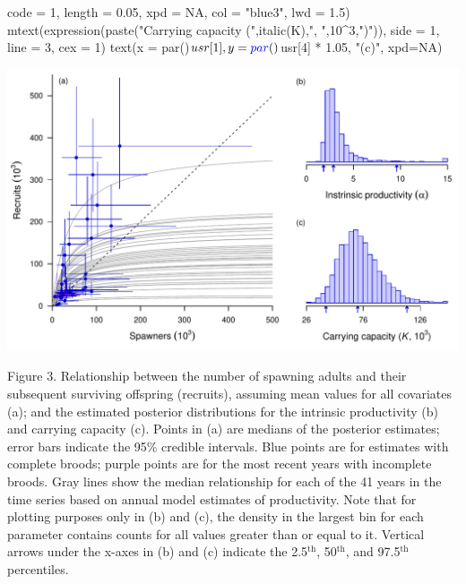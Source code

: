 \documentclass[11pt,]{article}
\newenvironment{Shaded}{}{}
\newcommand{\KeywordTok}[1]{\textcolor[rgb]{0.00,0.00,1.00}{#1}}
\newcommand{\DataTypeTok}[1]{#1}
\newcommand{\DecValTok}[1]{#1}
\newcommand{\FloatTok}[1]{#1}
\newcommand{\StringTok}[1]{\textcolor[rgb]{0.00,0.50,0.50}{#1}}
\newcommand{\OtherTok}[1]{\textcolor[rgb]{1.00,0.25,0.00}{#1}}
\newcommand{\OperatorTok}[1]{#1}
\newcommand{\NormalTok}[1]{#1}
\begin{document}
\begin{Shaded}
\begin{Highlighting}[]
       \DataTypeTok{code =} \DecValTok{1}\NormalTok{, }\DataTypeTok{length =} \FloatTok{0.05}\NormalTok{, }\DataTypeTok{xpd =} \OtherTok{NA}\NormalTok{, }\DataTypeTok{col =} \StringTok{"blue3"}\NormalTok{, }\DataTypeTok{lwd =} \FloatTok{1.5}\NormalTok{)}
\KeywordTok{mtext}\NormalTok{(}\KeywordTok{expression}\NormalTok{(}\KeywordTok{paste}\NormalTok{(}\StringTok{"Carrying capacity ("}\NormalTok{,}\KeywordTok{italic}\NormalTok{(K),}\StringTok{", "}\NormalTok{,}\DecValTok{10}\OperatorTok{^}\DecValTok{3}\NormalTok{,}\StringTok{")"}\NormalTok{)),}
      \DataTypeTok{side =} \DecValTok{1}\NormalTok{, }\DataTypeTok{line =} \DecValTok{3}\NormalTok{, }\DataTypeTok{cex =} \DecValTok{1}\NormalTok{)}
\KeywordTok{text}\NormalTok{(}\DataTypeTok{x =} \KeywordTok{par}\NormalTok{()}\OperatorTok{$}\NormalTok{usr[}\DecValTok{1}\NormalTok{],}
     \DataTypeTok{y =} \KeywordTok{par}\NormalTok{()}\OperatorTok{$}\NormalTok{usr[}\DecValTok{4}\NormalTok{] }\OperatorTok{*}\StringTok{ }\FloatTok{1.05}\NormalTok{,}
     \StringTok{"(c)"}\NormalTok{, }\DataTypeTok{xpd=}\OtherTok{NA}\NormalTok{)}
\end{Highlighting}
\end{Shaded}

\begin{center}\includegraphics{App_3_Summarize_results_files/figure-latex/fig_3_S-R-1} \end{center}

Figure 3. Relationship between the number of spawning adults and their
subsequent surviving offspring (recruits), assuming mean values for all
covariates (a); and the estimated posterior distributions for the
intrinsic productivity (b) and carrying capacity (c). Points in (a) are
medians of the posterior estimates; error bars indicate the 95\%
credible intervals. Blue points are for estimates with complete broods;
purple points are for the most recent years with incomplete broods. Gray
lines show the median relationship for each of the 41 years in the time
series based on annual model estimates of productivity. Note that for
plotting purposes only in (b) and (c), the density in the largest bin
for each parameter contains counts for all values greater than or equal
to it. Vertical arrows under the x-axes in (b) and (c) indicate the
2.5\(^\text{th}\), 50\(^\text{th}\), and 97.5\(^\text{th}\) percentiles.
\end{document}
